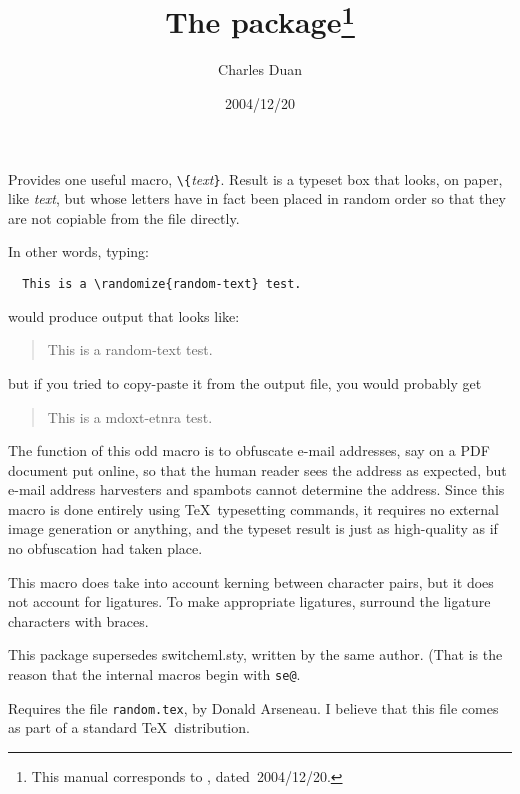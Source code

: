 \documentclass[pagesize=auto, parskip=half]{scrartcl}
\title{The \pkg{randtext} package\thanks{This manual corresponds to \pkg{randtext.sty}, dated~2004/12/20.}}
\author{Charles Duan}
\date{2004/12/20}
\makeatletter
\newcommand*{\pkg}[1]{\textsf{#1}}
\newcommand*{\cs}[1]{\texttt{\textbackslash#1}}
\newcommand*{\cmd}[1]{\cs{\expandafter\@gobble\string#1}}
\newcommand*{\meta}[1]{\textlangle\textsl{#1}\textrangle}
\newcommand*{\marg}[1]{\texttt{\{}\meta{#1}\texttt{\}}}
\makeatother
\begin{document}
\maketitle

Provides one useful macro, \cmd{\randomize}\marg{text}. Result is a typeset box that
looks, on paper, like \meta{text}, but whose letters have in fact been placed in
random order so that they are not copiable from the file directly.

In other words, typing:
%
\begin{verbatim}
  This is a \randomize{random-text} test.
\end{verbatim}
%
would produce output that looks like:
%
\begin{quote}
  This is a random-text test.
\end{quote}
%
but if you tried to copy-paste it from the output file, you would probably get
%
\begin{quote}
  This is a mdoxt-etnra test.
\end{quote}
%
The function of this odd macro is to obfuscate e-mail addresses, say on a PDF
document put online, so that the human reader sees the address as expected,
but e-mail address harvesters and spambots cannot determine the address. Since
this macro is done entirely using \TeX\ typesetting commands, it requires no
external image generation or anything, and the typeset result is just as
high-quality as if no obfuscation had taken place.

This macro does take into account kerning between character pairs, but it does
not account for ligatures. To make appropriate ligatures, surround the
ligature characters with braces.

This package supersedes \pkg{switcheml.sty}, written by the same author. (That is
the reason that the internal macros begin with \verb+se@+.

Requires the file \texttt{random.tex}, by Donald Arseneau. I believe that this file
comes as part of a standard \TeX\ distribution.
\end{document}
